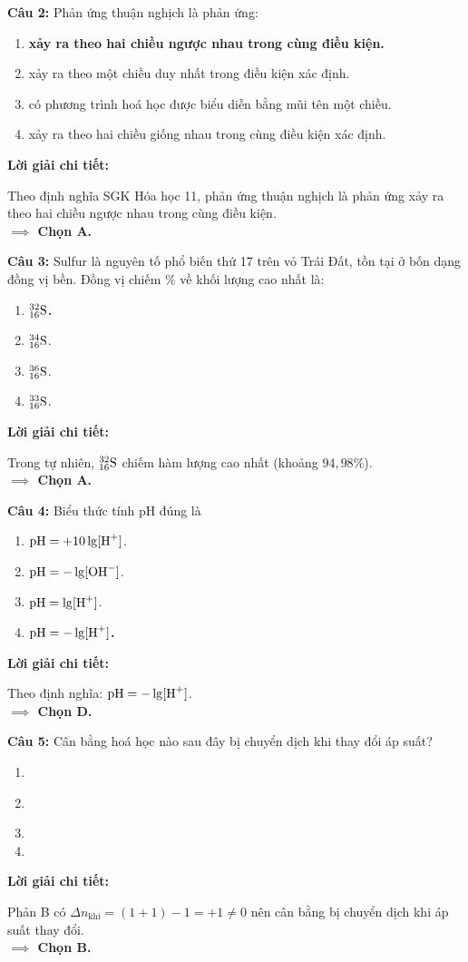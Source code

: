 \documentclass[10.5pt,a4paper]{article}
\newcommand{\loigiai}[1]{%
  \vspace{1pt}
  \begin{tcolorbox}
  {\color{myBlue}\bfseries Lời giải chi tiết:}\par\vspace{1pt}
  {\small #1}
  \end{tcolorbox}
  \vspace{2pt}
}
\begin{document}
\textbf{Câu 2:} Phản ứng thuận nghịch là phản ứng:
\begin{enumerate}[label=\textbf{\Alph*.}, itemsep=1pt, topsep=1pt, leftmargin=1.5cm]
    \item \textbf{\color{myRed}xảy ra theo hai chiều ngược nhau trong cùng điều kiện.}
    \item xảy ra theo một chiều duy nhất trong điều kiện xác định.
    \item có phương trình hoá học được biểu diễn bằng mũi tên một chiều.
    \item xảy ra theo hai chiều giống nhau trong cùng điều kiện xác định.
\end{enumerate}
\loigiai{Theo định nghĩa SGK Hóa học 11, phản ứng thuận nghịch là phản ứng xảy ra theo hai chiều ngược nhau trong cùng điều kiện.\\ \textbf{$\implies$ Chọn A.}}

\textbf{Câu 3:} Sulfur là nguyên tố phổ biến thứ 17 trên vỏ Trái Đất, tồn tại ở bốn dạng đồng vị bền. Đồng vị chiếm \% về khối lượng cao nhất là:
\begin{enumerate}[label=\textbf{\Alph*.}, itemsep=1pt, topsep=1pt, leftmargin=1.5cm]
    \item \textbf{\color{myRed}$^{32}_{16}\ce{S}$.} \hfill \item $^{34}_{16}\ce{S}$. \hfill \item $^{36}_{16}\ce{S}$. \hfill \item $^{33}_{16}\ce{S}$.
\end{enumerate}
\loigiai{Trong tự nhiên, $^{32}_{16}\ce{S}$ chiếm hàm lượng cao nhất (khoảng $94,98\%$).\\ \textbf{$\implies$ Chọn A.}}

\textbf{Câu 4:} Biểu thức tính pH đúng là
\begin{enumerate}[label=\textbf{\Alph*.}, itemsep=1pt, topsep=1pt, leftmargin=1.5cm]
    \item $\text{pH} = +10 \lg[\ce{H+}]$. \hfill \item $\text{pH} = -\lg[\ce{OH-}]$. \hfill \item $\text{pH} = \lg[\ce{H+}]$. \hfill \item \textbf{\color{myRed}$\text{pH} = -\lg[\ce{H+}]$.}
\end{enumerate}
\loigiai{Theo định nghĩa: $\text{pH} = -\lg[\ce{H+}]$.\\ \textbf{$\implies$ Chọn D.}}

\textbf{Câu 5:} Cân bằng hoá học nào sau đây bị chuyển dịch khi thay đổi áp suất?
\begin{enumerate}[label=\textbf{\Alph*.}, itemsep=1pt, topsep=1pt, leftmargin=1.5cm]
    \item {}
    \item \textbf{\color{myRed}}
    \item {}
    \item {}
\end{enumerate}
\loigiai{Phản B có $\Delta n_{\text{khí}} = (1 + 1) - 1 = +1 \neq 0$ nên cân bằng bị chuyển dịch khi áp suất thay đổi.\\ \textbf{$\implies$ Chọn B.}}
\end{document}
